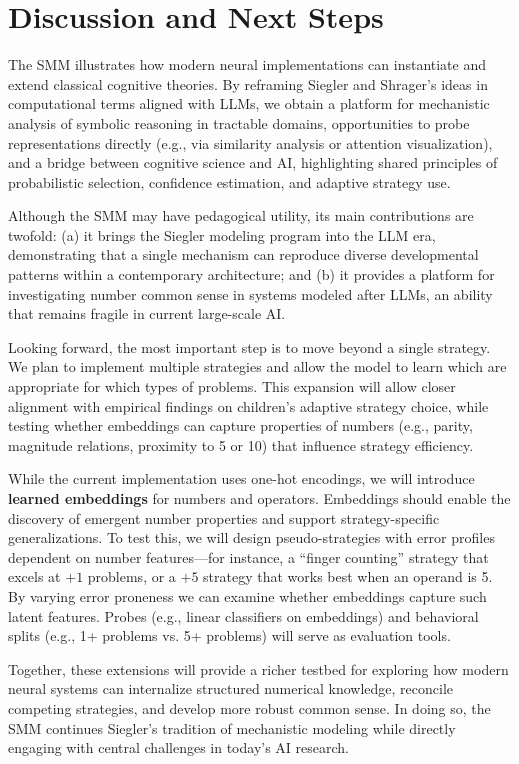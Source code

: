 \documentclass{article}
\begin{document}
\section{Discussion and Next Steps}
The SMM illustrates how modern neural implementations can instantiate and extend classical cognitive theories. By reframing Siegler and Shrager's ideas in computational terms aligned with LLMs, we obtain a platform for mechanistic analysis of symbolic reasoning in tractable domains, opportunities to probe representations directly (e.g., via similarity analysis or attention visualization), and a bridge between cognitive science and AI, highlighting shared principles of probabilistic selection, confidence estimation, and adaptive strategy use.

Although the SMM may have pedagogical utility, its main contributions are twofold: (a) it brings the Siegler modeling program into the LLM era, demonstrating that a single mechanism can reproduce diverse developmental patterns within a contemporary architecture; and (b) it provides a platform for investigating number common sense in systems modeled after LLMs, an ability that remains fragile in current large-scale AI.

Looking forward, the most important step is to move beyond a single strategy. We plan to implement multiple strategies and allow the model to learn which are appropriate for which types of problems. This expansion will allow closer alignment with empirical findings on children’s adaptive strategy choice, while testing whether embeddings can capture properties of numbers (e.g., parity, magnitude relations, proximity to 5 or 10) that influence strategy efficiency. 

While the current implementation uses one-hot encodings, we will introduce \textbf{learned embeddings} for numbers and operators. Embeddings should enable the discovery of emergent number properties and support strategy-specific generalizations. To test this, we will design pseudo-strategies with error profiles dependent on number features---for instance, a ``finger counting'' strategy that excels at $+1$ problems, or a $+5$ strategy that works best when an operand is 5. By varying error proneness we can examine whether embeddings capture such latent features. Probes (e.g., linear classifiers on embeddings) and behavioral splits (e.g., 1+ problems vs. 5+ problems) will serve as evaluation tools.

Together, these extensions will provide a richer testbed for exploring how modern neural systems can internalize structured numerical knowledge, reconcile competing strategies, and develop more robust common sense. In doing so, the SMM continues Siegler’s tradition of mechanistic modeling while directly engaging with central challenges in today’s AI research.
\end{document}
